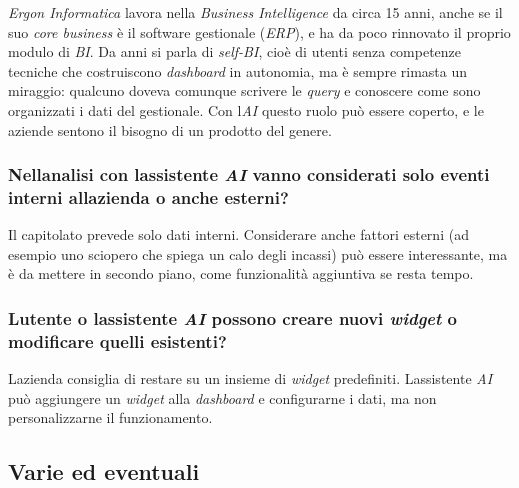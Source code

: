 \documentclass[12pt,a4paper]{article}
\begin{document}
\emph{Ergon Informatica} lavora nella \emph{Business Intelligence} da circa 15 anni, anche se il suo \emph{core business} è il software gestionale (\emph{ERP}), e ha da poco rinnovato il proprio modulo di \emph{BI}. Da anni si parla di \emph{self-BI}, cioè di utenti senza competenze tecniche che costruiscono \emph{dashboard} in autonomia, ma è sempre rimasta un miraggio: qualcuno doveva comunque scrivere le \emph{query} e conoscere come sono organizzati i dati del gestionale. Con l\textquotesingle{}\emph{AI} questo ruolo può essere coperto, e le aziende sentono il bisogno di un prodotto del genere.

\hypertarget{nellanalisi-con-lassistente-ai-vanno-considerati-solo-eventi-interni-allazienda-o-anche-esterni}{%
\subsubsection{\texorpdfstring{Nell\textquotesingle analisi con l\textquotesingle assistente \emph{AI} vanno considerati solo eventi interni all\textquotesingle azienda o anche esterni?}{Nell\textquotesingle analisi con l\textquotesingle assistente AI vanno considerati solo eventi interni all\textquotesingle azienda o anche esterni?}}}

Il capitolato prevede solo dati interni. Considerare anche fattori esterni (ad esempio uno sciopero che spiega un calo degli incassi) può essere interessante, ma è da mettere in secondo piano, come funzionalità aggiuntiva se resta tempo.

\hypertarget{lutente-o-lassistente-ai-possono-creare-nuovi-widget-o-modificare-quelli-esistenti}{%
\subsubsection{\texorpdfstring{L\textquotesingle utente o l\textquotesingle assistente \emph{AI} possono creare nuovi \emph{widget} o modificare quelli esistenti?}{L\textquotesingle utente o l\textquotesingle assistente AI possono creare nuovi widget o modificare quelli esistenti?}}}

L\textquotesingle azienda consiglia di restare su un insieme di \emph{widget} predefiniti. L\textquotesingle assistente \emph{AI} può aggiungere un \emph{widget} alla \emph{dashboard} e configurarne i dati, ma non personalizzarne il funzionamento.

\hypertarget{varie-ed-eventuali}{%
\subsection{Varie ed eventuali}}
\end{document}
